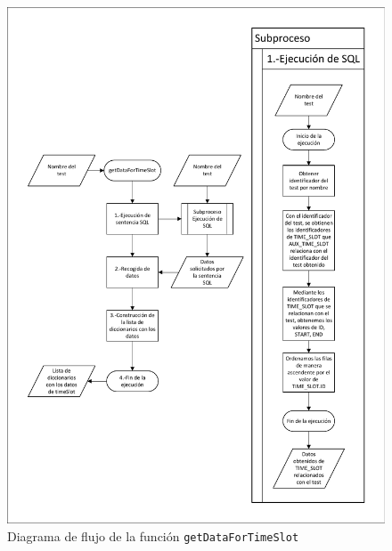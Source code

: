 
\begin{figure}[H]
\centering
\includegraphics[width=.85\textwidth]{fig/Diagramas de flujo/getDataForTimeSlot.pdf}
\caption{Diagrama de flujo de la función \texttt{getDataForTimeSlot}}
\label{fig:diagramaFlujoGetDataForTimeSlot}
\end{figure}

